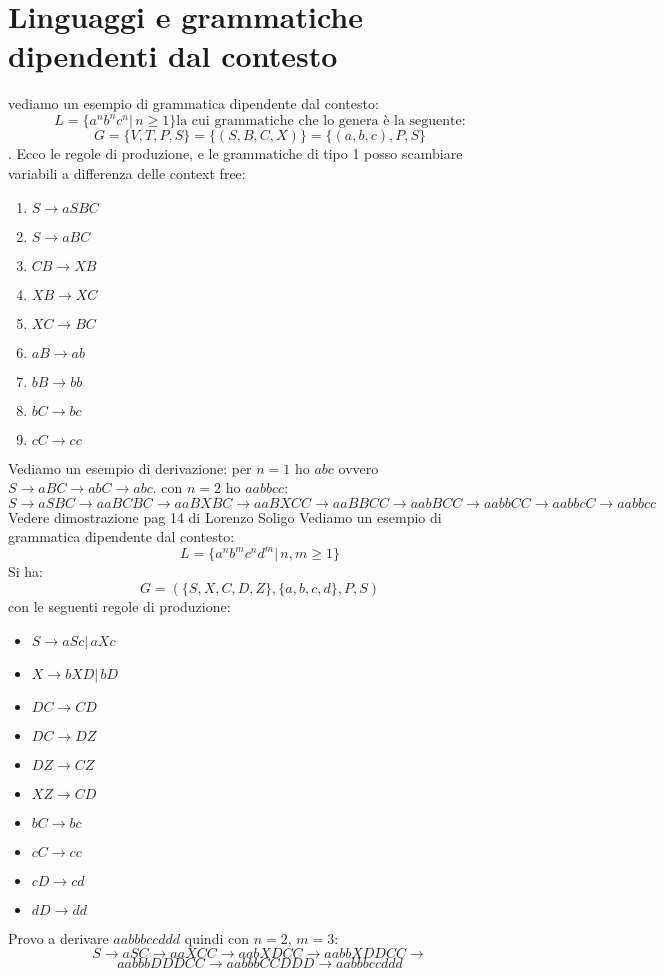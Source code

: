 \documentclass[a4paper]{book}
\theoremstyle{definition}%
\begin{document}
\chapter{Linguaggi e grammatiche dipendenti dal contesto}
vediamo un esempio di grammatica dipendente dal contesto:
\[L=\{a^nb^nc^n|\, n\geq 1\} \text{la cui grammatiche che lo genera è la seguente:} \]
\[ G=\{V,T,P,S\}=\{(S,B,C,X)\}=\{(a,b,c),P,S\}\].\newline
Ecco le regole di produzione, e le grammatiche di tipo 1 posso scambiare variabili a differenza delle context free:
\begin{enumerate}
\item $S\to aSBC$
\item $S\to aBC$
\item $CB\to XB$
\item $XB\to XC$
\item $XC\to BC$
\item $aB\to ab$
\item $bB\to bb$
\item $bC\to bc$
\item $cC\to cc$
\end{enumerate}
Vediamo un esempio di derivazione:
per $n=1$ ho $abc$ ovvero $S \to aBC \to abC \to abc$.\newline
con $n=2$ ho $aabbcc$:
\[ S\to aSBC\to aaBCBC\to aaBXBC\to aaBXCC\to aaBBCC\to aabBCC\to aabbCC\to aabbcC\to aabbcc \]
Vedere dimostrazione pag 14 di Lorenzo Soligo
Vediamo un esempio di grammatica dipendente dal contesto:
\[ L=\{a^nb^mc^nd^m|\, n,m\geq 1\} \]
Si ha:
\[ G=(\{S,X,C,D,Z\},\{a,b,c,d\},P,S) \]
con le seguenti regole di produzione:
\begin{itemize}
\item $S\to aSc|\, aXc$
\item $X\to bXD|\, bD$
\item $DC\to CD$
\item $DC\to DZ$
\item $DZ\to CZ$
\item $XZ\to CD$
\item $bC\to bc$
\item $cC\to cc$
\item $cD\to cd$
\item $dD\to dd$
\end{itemize}
Provo a derivare $aabbbccddd$ quindi con $n=2,\,m=3$:
\[ S\to aSC\to aaXCC\to aabXDCC\to aabbXDDCC\to \]
\[ aabbbDDDCC\to aabbbCCDDD\to aabbbccddd \]
\end{document}

